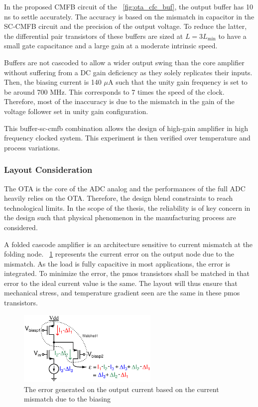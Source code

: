 In the proposed CMFB circuit of the \figurename~\ref{fig:ota_cfc_buf}, the output buffer has 10 ns to settle accurately. The accuracy is based on the mismatch in capacitor in the SC-CMFB circuit and the precision of the output voltage. To reduce the latter, the differential pair transistors of these buffers are sized at \(L = 3 L_{\min} \) to have a small gate capacitance and a large gain at a moderate intrinsic speed. 

Buffers are not cascoded to allow a wider output swing than the core amplifier without suffering from a DC gain deficiency as they solely replicates their inputs. Then, the biasing current is 140 \(\mu \)A such that the unity gain frequency is set to be around 700 MHz. This corresponds to 7 times the speed of the clock. Therefore, most of the inaccuracy is due to the mismatch in the gain of the voltage follower set in unity gain configuration.

This buffer-sc-cmfb combination allows the design of high-gain amplifier in high frequency clocked system. This experiment is then verified over temperature and process variations.

\subsubsection{Layout Consideration}
The OTA is the core of the ADC analog and the performances of the full ADC heavily relies on the OTA\@. Therefore, the design blend constraints to reach technological limits. In the scope of the thesis, the reliability is of key concern in the design such that physical phenomenon in the manufacturing process are considered.

A folded cascode amplifier is an architecture sensitive to current mismatch at the folding node. \figurename~\ref{fig:folded-node-mismatch} represents the current error on the output node due to the mismatch. As the load is fully capacitive in most applications, the error is integrated. To minimize the error, the pmos transistors shall be matched in that error to the ideal current value is the same. The layout will thus ensure that mechanical stress, and temperature gradient seen are the same in these pmos transistors.

\begin{figure}[htp]
    \centering
    \includegraphics[width=0.6\textwidth]{Chapter7/Figs/folded-mismatch-gradient.ps}
    \caption{The error generated on the output current based on the current mismatch due to the biasing}
    \label{fig:folded-node-mismatch}
\end{figure}

